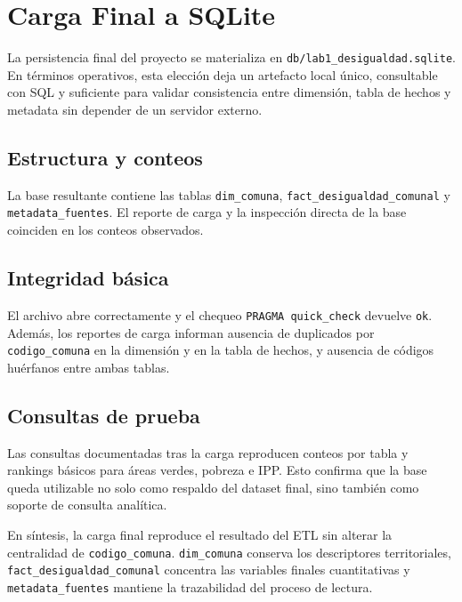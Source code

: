 \chapter{Carga Final a SQLite}

La persistencia final del proyecto se materializa en \texttt{db/lab1\_desigualdad.sqlite}. En términos operativos, esta elección deja un artefacto local único, consultable con SQL y suficiente para validar consistencia entre dimensión, tabla de hechos y metadata sin depender de un servidor externo.

\section{Estructura y conteos}

La base resultante contiene las tablas \texttt{dim\_comuna}, \texttt{fact\_desigualdad\_comunal} y \texttt{metadata\_fuentes}. El reporte de carga y la inspección directa de la base coinciden en los conteos observados.



\section{Integridad básica}

El archivo abre correctamente y el chequeo \texttt{PRAGMA quick\_check} devuelve \texttt{ok}. Además, los reportes de carga informan ausencia de duplicados por \texttt{codigo\_comuna} en la dimensión y en la tabla de hechos, y ausencia de códigos huérfanos entre ambas tablas.

\section{Consultas de prueba}

Las consultas documentadas tras la carga reproducen conteos por tabla y rankings básicos para áreas verdes, pobreza e IPP. Esto confirma que la base queda utilizable no solo como respaldo del dataset final, sino también como soporte de consulta analítica.



En síntesis, la carga final reproduce el resultado del ETL sin alterar la centralidad de \texttt{codigo\_comuna}. \texttt{dim\_comuna} conserva los descriptores territoriales, \texttt{fact\_desigualdad\_comunal} concentra las variables finales cuantitativas y \texttt{metadata\_fuentes} mantiene la trazabilidad del proceso de lectura.
